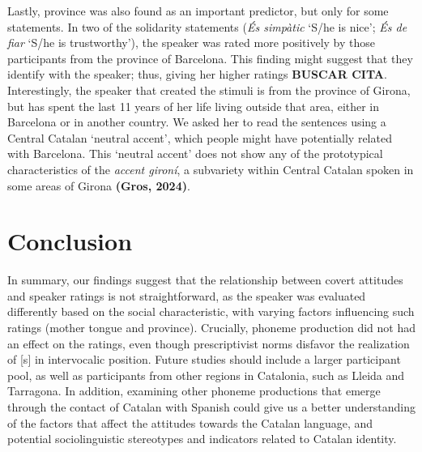 \documentclass[
  a4paper,
  11pt,
  twocolumn]{article}
\begin{document}
Lastly, province was also found as an important predictor, but only for
some statements. In two of the solidarity statements (\emph{És simpàtic}
`S/he is nice'; \emph{És de fiar} `S/he is trustworthy'), the speaker
was rated more positively by those participants from the province of
Barcelona. This finding might suggest that they identify with the
speaker; thus, giving her higher ratings \textbf{BUSCAR CITA}.
Interestingly, the speaker that created the stimuli is from the province
of Girona, but has spent the last 11 years of her life living outside
that area, either in Barcelona or in another country. We asked her to
read the sentences using a Central Catalan `neutral accent', which
people might have potentially related with Barcelona. This `neutral
accent' does not show any of the prototypical characteristics of the
\emph{accent gironí}, a subvariety within Central Catalan spoken in some
areas of Girona \textbf{(Gros, 2024)}.

\section{Conclusion}

In summary, our findings suggest that the relationship between covert
attitudes and speaker ratings is not straightforward, as the speaker was
evaluated differently based on the social characteristic, with varying
factors influencing such ratings (mother tongue and province).
Crucially, phoneme production did not had an effect on the ratings, even
though prescriptivist norms disfavor the realization of {[}s{]} in
intervocalic position. Future studies should include a larger
participant pool, as well as participants from other regions in
Catalonia, such as Lleida and Tarragona. In addition, examining other
phoneme productions that emerge through the contact of Catalan with
Spanish could give us a better understanding of the factors that affect
the attitudes towards the Catalan language, and potential
sociolinguistic stereotypes and indicators related to Catalan identity.



\end{document}
